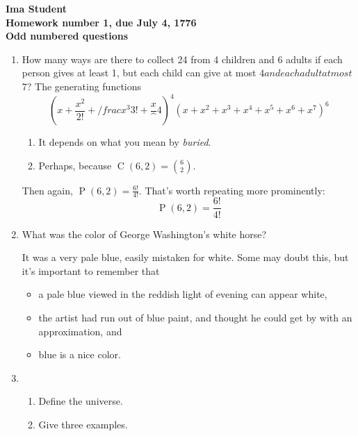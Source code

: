 \documentclass[12pt]{amsart}
\DeclareMathOperator{\perm}{P}
\DeclareMathOperator{\comb}{C}
\begin{document}
\begin{center}
  \bfseries
  Ima Student\\
  Homework number 1, due July 4, 1776\\
  Odd numbered questions
\end{center}

\bigskip

\begin{enumerate}
\item  How many ways are there to collect 24 from 4 children and 6 adults if each
person gives at least 1, but each child can give at most $4 and each adult at
most $7?
\bigskip
The generating functions
\begin{displaymath}
(x+\frac{x^2}{2!}+/frac{x^3}{3!}+\frac x^4)^4(x+x^2+x^3+x^4+x^5+x^6+x^7)^6
\end{displaymath}
  \begin{enumerate}
  \item It depends on what you mean by \emph{buried}.
  \item Perhaps, because $\comb(6,2) = \binom{6}{2}$.
  \end{enumerate}
  Then again, $\perm(6,2) = \frac{6!}{4!}$.  That's worth repeating
  more prominently:
  \begin{displaymath}
    \perm(6,2) = \frac{6!}{4!}
  \end{displaymath}

\item What was the color of George Washington's white horse?

  It was a very pale blue, easily mistaken for white.  Some may doubt
  this, but it's important to remember that
  \begin{itemize}
  \item a pale blue viewed in the reddish light of evening can appear
    white,
  \item the artist had run out of blue paint, and thought he could get
    by with an approximation, and
  \item blue is a nice color.
  \end{itemize}

\item
  \begin{enumerate}
  \item Define the universe.
  \item Give three examples.
  \end{enumerate}

\bigskip


\end{enumerate}
\end{document}
